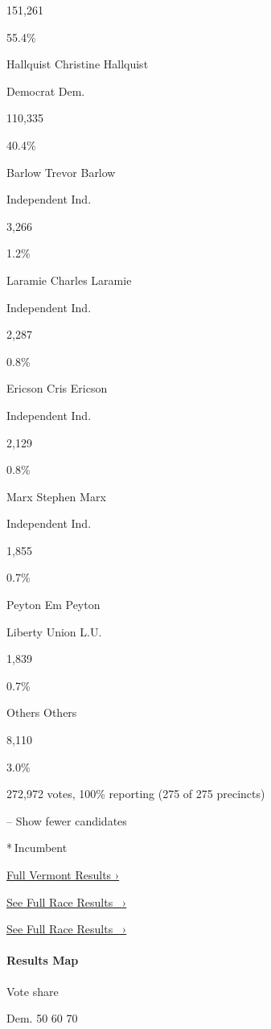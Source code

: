 151,261

55.4\%

 Hallquist Christine Hallquist

Democrat Dem.

110,335

40.4\%

 Barlow Trevor Barlow

Independent Ind.

3,266

1.2\%

 Laramie Charles Laramie

Independent Ind.

2,287

0.8\%

 Ericson Cris Ericson

Independent Ind.

2,129

0.8\%

 Marx Stephen Marx

Independent Ind.

1,855

0.7\%

 Peyton Em Peyton

Liberty Union L.U.

1,839

0.7\%

 Others Others

8,110

3.0\%

272,972 votes, 100\% reporting (275 of 275 precincts)

-- Show fewer candidates

* Incumbent

\href{https://www.nytimes3xbfgragh.onion/interactive/2018/11/06/us/elections/results-vermont-elections.html}{Full
Vermont Results ›}

\href{https://www.nytimes3xbfgragh.onion/elections/results/vermont-governor}{See
Full Race Results~ ›}

\href{https://www.nytimes3xbfgragh.onion/elections/results/vermont-governor}{See
Full Race Results~ ›}

\hypertarget{results-map-2}{%
\paragraph{Results Map}\label{results-map-2}}

Vote share

Dem. 50 60 70

